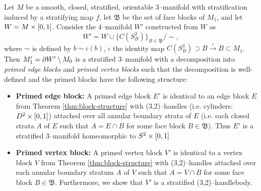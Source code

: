\begin{theorem}
	\label{thm:primed-block-structure}
	Let $M$ be a smooth, closed, stratified, orientable 3--manifold with stratification induced by a stratifying map $f$, let $\mathfrak{B}$ be the set of face blocks of $M_1$, and let $W=M\times[0,1]$.
	Consider the 4--manifold $W'$ constructed from $W$ as
	\[
		W' = W\cup\{C(S_B^3)\}_{B\in \mathfrak{B}} / \sim,
	\]
	where $\sim$ is defined by $b\sim \iota(b)$, $\iota$ the identity map $C(S_B^3)\supset B\overset{\iota}{\to} B\subset M_1$.
	Then $M_1'=\partial W'\setminus M_0$ is a stratified 3--manifold with a decomposition into \emph{primed edge blocks} and \emph{primed vertex blocks} such that the decomposition is well-defined and the primed blocks have the following structure:
	{\renewcommand\labelitemi{}
		\begin{itemize}
			\item \textbf{Primed edge block:}
			A primed edge block $E'$ is identical to an edge block $E$ from Theorem \ref{thm:block-structure} with (3,2)--handles (i.e. cylinders: $D^2\times[0,1]$) attached over all annular boundary strata of $E$ (i.e. each closed strata $A$ of $E$ such that $A=E\cap B$ for some face block $B\in\mathfrak{B}$).
			Thus $E'$ is a stratified 3--manifold homeomorphic to $S^2\times[0,1]$
			
			\item \textbf{Primed vertex block:}
			A primed vertex block $V'$ is identical to a vertex block $V$ from Theorem \ref{thm:block-structure} with (3,2)--handles attached over each annular boundary stratum $A$ of $V$ such that $A=V\cap B$ for some face block $B\in\mathfrak{B}$.
			Furthermore, we show that $V'$ is a stratified (3,2)--handlebody.
		\end{itemize}
	}
\end{theorem}

